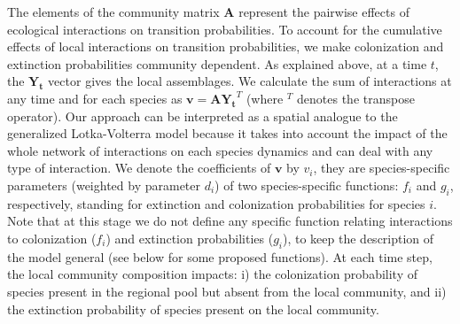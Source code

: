 The elements of the community matrix $\mathbf{A}$ represent the pairwise effects of ecological interactions on transition probabilities. To account for the cumulative effects of local interactions on transition probabilities, we make colonization and extinction probabilities community dependent. As explained above, at a time $t$, the $\mathbf{Y_t}$ vector gives the local assemblages. We calculate the sum of interactions at any time and for each species as $\mathbf{v}=\mathbf{A}\mathbf{Y_t}^T$ (where $^T$ denotes the transpose operator). Our approach can be interpreted as a spatial analogue to the generalized Lotka-Volterra model because it takes into account the impact of the whole network of interactions on each species dynamics and can deal with any type of interaction. We denote the coefficients of $\mathbf{v}$ by $v_i$, they are species-specific parameters (weighted by parameter $d_i$) of two species-specific functions: $f_i$ and $g_i$, respectively, standing for extinction and colonization probabilities for species $i$. Note that at this stage we do not define any specific function relating interactions to colonization ($f_i$) and extinction probabilities ($g_i$), to keep the description of the model general (see below for some proposed functions). At each time step, the local community composition impacts: i) the colonization probability of species present in the regional pool but absent from the local community, and ii) the extinction probability of species present on the local community.

